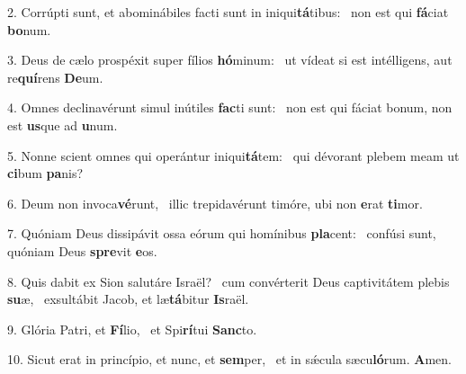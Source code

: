 2. Corrúpti sunt, et abominábiles facti sunt in iniqui\textbf{tá}tibus: \ast\  non est qui \textbf{fá}ciat \textbf{bo}num.\

3. Deus de cælo prospéxit super fílios \textbf{hó}minum: \ast\  ut vídeat si est intélligens, aut re\textbf{quí}rens \textbf{De}um.\

4. Omnes declinavérunt simul inútiles \textbf{fac}ti sunt: \ast\  non est qui fáciat bonum, non est \textbf{us}que ad \textbf{u}num.\

5. Nonne scient omnes qui operántur iniqui\textbf{tá}tem: \ast\  qui dévorant plebem meam ut \textbf{ci}bum \textbf{pa}nis?\

6. Deum non invoca\textbf{vé}runt, \ast\  illic trepidavérunt timóre, ubi non \textbf{e}rat \textbf{ti}mor.\

7. Quóniam Deus dissipávit ossa eórum qui homínibus \textbf{pla}cent: \ast\  confúsi sunt, quóniam Deus \textbf{spre}vit \textbf{e}os.\

8. Quis dabit ex Sion salutáre Israël? \dag\  cum convérterit Deus captivitátem plebis \textbf{su}æ, \ast\  exsultábit Jacob, et læ\textbf{tá}bitur \textbf{Is}raël.\

9. Glória Patri, et \textbf{Fí}lio, \ast\  et Spi\textbf{rí}tui \textbf{Sanc}to.\

10. Sicut erat in princípio, et nunc, et \textbf{sem}per, \ast\  et in sǽcula sæcu\textbf{ló}rum. \textbf{A}men.\


